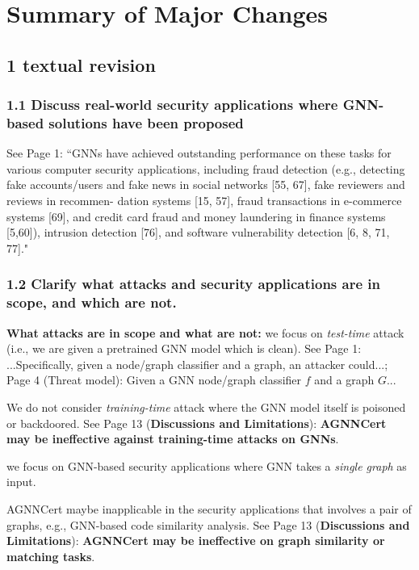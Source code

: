 \documentclass[10pt]{article}
\begin{document}

\section*{\Large \centering \bf Summary of Major Changes}

\subsection*{1 textual revision} 

\subsubsection*{1.1 Discuss real-world security applications where GNN-based solutions have been proposed}

See Page 1: {``GNNs have
achieved outstanding performance on these tasks for various computer security applications, including fraud detection
(e.g., detecting fake accounts/users and fake news in social
networks [55, 67], fake reviewers and reviews in recommen-
dation systems [15, 57], fraud transactions in e-commerce
systems [69], and credit card fraud and money laundering in
finance systems [5,60]), intrusion detection [76], and software
vulnerability detection [6, 8, 71, 77]."}


\subsubsection*{1.2 Clarify what attacks and security applications are in scope, and which are not.}

{\bf What attacks are in scope and what are not:} we focus on \emph{test-time} attack (i.e., we are given a pretrained GNN model which is clean). See Page 1: ...Specifically, given
a node/graph classifier and a graph, an attacker could...; Page 4 (Threat model): Given a GNN node/graph classifier $f$ and a graph $G$... 

We do not consider \emph{training-time} attack where the GNN model itself is poisoned or backdoored. See Page 13 ({\bf Discussions and Limitations}): {\bf AGNNCert may be ineffective against training-time attacks on GNNs}.

\vspace{+0.05in}
 we focus on GNN-based security applications where GNN takes a \emph{single graph} as input. 

AGNNCert maybe inapplicable in the security applications that involves a pair of graphs, e.g., GNN-based code similarity analysis. See  Page 13 ({\bf Discussions and Limitations}): {\bf AGNNCert may be ineffective on graph similarity or
matching tasks}.   
\end{document}

